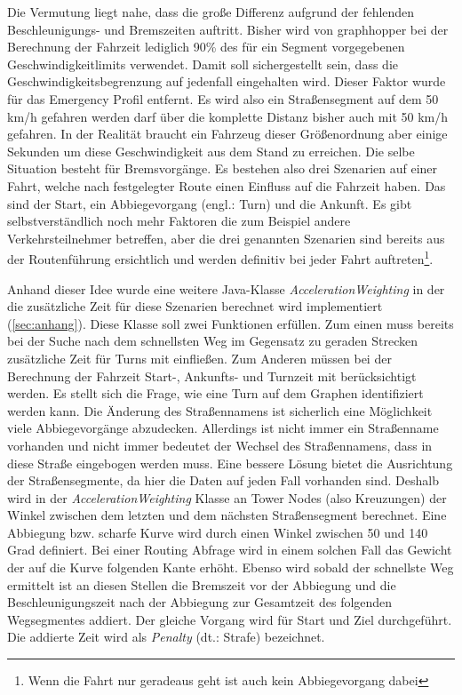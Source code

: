 \documentclass[12pt,a4paper]{article}
\begin{document}
Die Vermutung liegt nahe, dass die große Differenz aufgrund der fehlenden Beschleunigungs- und Bremszeiten auftritt. Bisher wird von graphhopper bei der Berechnung der Fahrzeit lediglich 90\% des für ein Segment vorgegebenen Geschwindigkeitlimits verwendet. Damit soll sichergestellt sein, dass die Geschwindigkeitsbegrenzung auf jedenfall eingehalten wird. Dieser Faktor wurde für das Emergency Profil entfernt.
Es wird also ein Straßensegment auf dem 50 km/h gefahren werden darf über die komplette Distanz bisher auch mit 50 km/h gefahren.
In der Realität braucht ein Fahrzeug dieser Größenordnung aber einige Sekunden um diese Geschwindigkeit aus dem Stand zu erreichen. Die selbe Situation besteht für Bremsvorgänge.
Es bestehen also drei Szenarien auf einer Fahrt, welche nach festgelegter Route einen Einfluss auf die Fahrzeit haben. Das sind der Start, ein Abbiegevorgang (engl.: Turn) und die Ankunft. Es gibt selbstverständlich noch mehr Faktoren die zum Beispiel andere Verkehrsteilnehmer betreffen, aber die drei genannten Szenarien sind bereits aus der Routenführung ersichtlich und werden definitiv bei jeder Fahrt auftreten\footnote{Wenn die Fahrt nur geradeaus geht ist auch kein Abbiegevorgang dabei}.

Anhand dieser Idee wurde eine weitere Java-Klasse \textit{AccelerationWeighting} in der die zusätzliche Zeit für diese Szenarien berechnet wird implementiert (\ref{sec:anhang}).
Diese Klasse soll zwei Funktionen erfüllen. Zum einen muss bereits bei der Suche nach dem schnellsten Weg im Gegensatz zu geraden Strecken zusätzliche Zeit für Turns mit einfließen. Zum Anderen müssen bei der Berechnung der Fahrzeit Start-, Ankunfts- und Turnzeit mit berücksichtigt werden. 
Es stellt sich die Frage, wie eine Turn auf dem Graphen identifiziert werden kann. Die Änderung des Straßennamens ist sicherlich eine Möglichkeit viele Abbiegevorgänge abzudecken. Allerdings ist nicht immer ein Straßenname vorhanden und nicht immer bedeutet der Wechsel des Straßennamens, dass in diese Straße eingebogen werden muss.
Eine bessere Lösung bietet die Ausrichtung der Straßensegmente, da hier die Daten auf jeden Fall vorhanden sind. Deshalb wird in der \textit{AccelerationWeighting} Klasse an Tower Nodes (also Kreuzungen) der Winkel zwischen dem letzten und dem nächsten Straßensegment berechnet.
Eine Abbiegung bzw. scharfe Kurve wird durch einen Winkel zwischen 50 und 140 Grad definiert.
Bei einer Routing Abfrage wird in einem solchen Fall das Gewicht der auf die Kurve folgenden Kante erhöht. Ebenso wird sobald der schnellste Weg ermittelt ist an diesen Stellen die Bremszeit vor der Abbiegung und die Beschleunigungszeit nach der Abbiegung zur Gesamtzeit des folgenden Wegsegmentes addiert. Der gleiche Vorgang wird für Start und Ziel durchgeführt. Die addierte Zeit wird als \textit{Penalty} (dt.: Strafe) bezeichnet.
\end{document}
